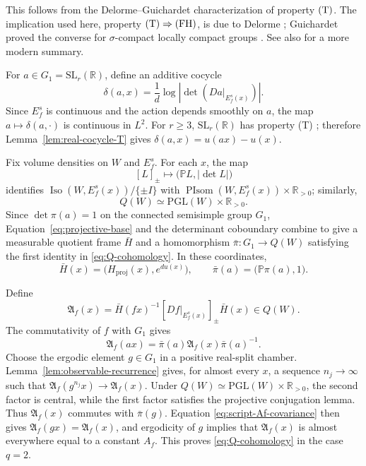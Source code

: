 \documentclass[11pt]{amsart}
\numberwithin{equation}{section}
\newcommand{\SL}{\mathrm{SL}}
\newcommand{\PGL}{\mathrm{PGL}}
\theoremstyle{plain}
\begin{document}
This follows from the Delorme--Guichardet characterization of property
${\rm (T)}$.  The implication used here, property ${\rm (T)}\Rightarrow
{\rm (FH)}$, is due to Delorme \cite[Theorem~V.1]{Delorme}; Guichardet
proved the converse for $\sigma$-compact locally compact groups
\cite{Guichardet}.  See also
\cite[Proposition~2.2.10 and Theorem~2.12.4]{BHV} for a more modern summary. 


For $a\in G_1=\SL_r(\mathbb R)$, define an additive cocycle
\[
\delta(a,x)=\frac1d
 \log\left|\det(Da|_{E_f^s(x)})\right|.
\]
 Since $E_f^s$ is continuous and the
action depends smoothly on $a$, the map
$a\mapsto\delta(a,\cdot)$ is continuous in $L^2$. For $r\ge3$,
$\SL_r(\mathbb R)$ has property {\rm (T)} \cite{Kazhdan}; therefore
Lemma~\ref{lem:real-cocycle-T} gives
$\delta(a,x)=u(ax)-u(x)$.

Fix volume densities on $W$ and $E_f^s$. For each $x$, the map
\[
[L]_\pm\longmapsto
\bigl(\mathbb P L,|\det L|\bigr)
\]
identifies
$\operatorname{Iso}(W,E_f^s(x))/\{\pm I\}$ with
$\operatorname{PIsom}(W,E_f^s(x))\times\mathbb R_{>0}$; similarly,
\[
Q(W)\simeq\PGL(W)\times\mathbb R_{>0}.
\]
Since $\det\pi(a)=1$ on the connected semisimple group $G_1$,
Equation~\eqref{eq:projective-base} and the determinant coboundary
combine to give a measurable quotient frame $\bar H$ and a
homomorphism $\bar\pi:G_1\to Q(W)$ satisfying the first identity in
\eqref{eq:Q-cohomology}. In these coordinates,
\[
\bar H(x)=\bigl(H_{\mathrm{proj}}(x),e^{du(x)}\bigr),
\qquad
\bar\pi(a)=\bigl(\mathbb P\pi(a),1\bigr).
\]

Define
\[
\mathfrak A_f(x)=\bar H(fx)^{-1}[Df|_{E_f^s(x)}]_\pm\bar H(x)\in Q(W).
\]
The commutativity of $f$ with $G_1$ gives
\begin{equation}\label{eq:script-Af-covariance}
\mathfrak A_f(ax)=\bar\pi(a)\mathfrak A_f(x)\bar\pi(a)^{-1}.
\end{equation}
Choose the ergodic element $g\in G_1$ in a positive real-split
chamber. Lemma~\ref{lem:observable-recurrence} gives, for almost every
$x$, a sequence $n_j\to\infty$ such that
$\mathfrak A_f(g^{n_j}x)\to \mathfrak A_f(x)$. Under
$Q(W)\simeq\PGL(W)\times\mathbb R_{>0}$, the second factor is central,
while the first factor satisfies the projective conjugation lemma.
Thus $\mathfrak A_f(x)$ commutes with $\bar\pi(g)$. Equation
\eqref{eq:script-Af-covariance} then gives
$\mathfrak A_f(gx)=\mathfrak A_f(x)$, and ergodicity
of $g$ implies that $\mathfrak A_f(x)$ is almost everywhere equal to a constant
$A_f$. This proves \eqref{eq:Q-cohomology} in the case $q=2$.
\end{document}
